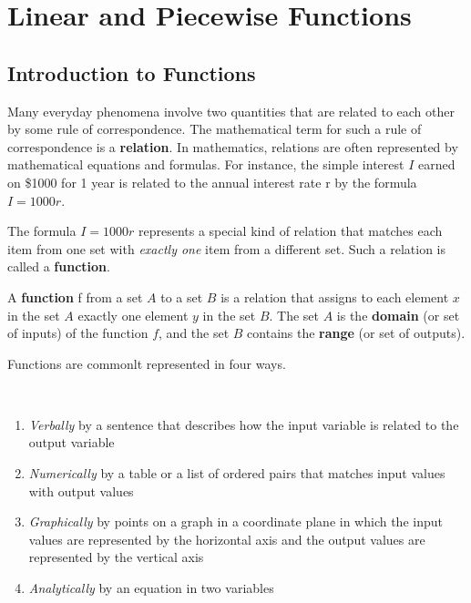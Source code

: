 \chapter{Linear and Piecewise Functions}

\section{Introduction to Functions}

Many everyday phenomena involve two quantities that are related to each other by some rule of correspondence. The mathematical term for such a rule of correspondence is a \textbf{relation}. In mathematics, relations are often represented by mathematical equations and formulas. For instance, the simple interest $I$ earned on \$1000 for 1 year is related to the annual interest rate r by the formula $I = 1000r$.  \cite{ci}

The formula $I = 1000r$ represents a special kind of relation that matches each item from one set with \textit{exactly one} item from a different set. Such a relation is called a \textbf{function}.

\begin{definition}[Function]
	A \textbf{function} f from a set $A$ to a set $B$ is a relation that assigns to each element $x$ in the set $A$ exactly one element $y$ in the set $B$. The set $A$ is the \textbf{domain} (or set of inputs) of the function $f$, and the set $B$ contains the \textbf{range} (or set of outputs). \cite{ci}
\end{definition}

Functions are commonlt represented in four ways.

\begin{proposition}~\newline
	\begin{enumerate}
		\item \textit{Verbally} by a sentence that describes how the input variable is related to the output variable
		\item \textit{Numerically} by a table or a list of ordered pairs that matches input values with output values
		\item \textit{Graphically} by points on a graph in a coordinate plane in which the input values are represented by the horizontal axis and the output values are represented by the vertical axis
		\item \textit{Analytically} by an equation in two variables
	\end{enumerate}
	\cite{ci}
\end{proposition}


